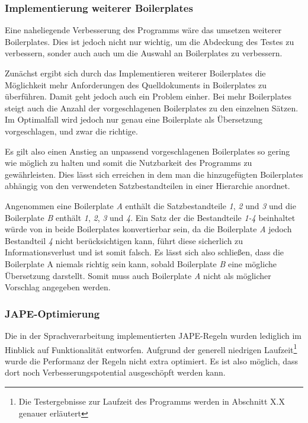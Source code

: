 \documentclass[12pt]{report}
\begin{document}
\subsubsection{Implementierung weiterer Boilerplates}
Eine naheliegende Verbesserung des Programms wäre das umsetzen weiterer Boilerplates. Dies ist jedoch nicht nur wichtig, um die Abdeckung des Testes zu verbessern, sonder auch auch um die Auswahl an Boilerplates zu verbessern. 

Zunächst ergibt sich durch das Implementieren weiterer Boilerplates die Möglichkeit mehr Anforderungen des Quelldokuments in Boilerplates zu überführen. Damit geht jedoch auch ein Problem einher. Bei mehr Boilerplates steigt auch die Anzahl der vorgeschlagenen Boilerplates zu den einzelnen Sätzen. Im Optimalfall wird jedoch nur genau eine Boilerplate als Übersetzung vorgeschlagen, und zwar die richtige. 

Es gilt also einen Anstieg an unpassend vorgeschlagenen Boilerplates so gering wie möglich zu halten und somit die Nutzbarkeit des Programms zu gewährleisten. Dies lässt sich erreichen in dem man die hinzugefügten Boilerplates abhängig von den verwendeten Satzbestandteilen in einer Hierarchie anordnet. 

Angenommen eine Boilerplate \textit{A} enthält die Satzbestandteile \textit{1}, \textit{2} und \textit{3} und die Boilerplate \textit{B} enthält \textit{1}, \textit{2}, \textit{3} und \textit{4}. Ein Satz der die Bestandteile \textit{1-4} beinhaltet würde von in beide Boilerplates konvertierbar sein, da die Boilerplate \textit{A} jedoch Bestandteil \textit{4} nicht berücksichtigen kann, führt diese sicherlich zu Informationsverlust und ist somit falsch. Es lässt sich also schließen, dass die Boilerplate A niemals richtig sein kann, sobald Boilerplate \textit{B} eine  mögliche Übersetzung darstellt. Somit muss auch Boilerplate \textit{A} nicht als möglicher Vorschlag angegeben werden. 
\subsubsection{JAPE-Optimierung}
Die in der Sprachverarbeitung implementierten JAPE-Regeln wurden lediglich im Hinblick auf Funktionalität entworfen. Aufgrund der generell niedrigen Laufzeit\footnote{Die Testergebnisse zur Laufzeit des Programms werden in Abschnitt X.X genauer erläutert} wurde die Performanz der Regeln nicht extra optimiert. Es ist also möglich, dass dort noch Verbesserungspotential ausgeschöpft werden kann. 
\end{document}
